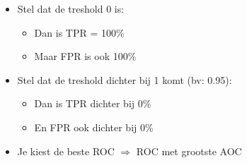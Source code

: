 \documentclass{article}
\begin{document}
\begin{itemize}
    \item Stel dat de treshold 0 is:
    \begin{itemize}
        \item Dan is TPR = 100\%
        \item Maar FPR is ook 100\%
    \end{itemize}
    \item Stel dat de treshold dichter bij 1 komt (bv: 0.95):
    \begin{itemize}
        \item Dan is TPR dichter bij 0\%
        \item En FPR ook dichter bij 0\%
    \end{itemize}
    \item Je kiest de beste ROC $\Rightarrow$ ROC met grootste AOC
\end{itemize}
\end{document}
